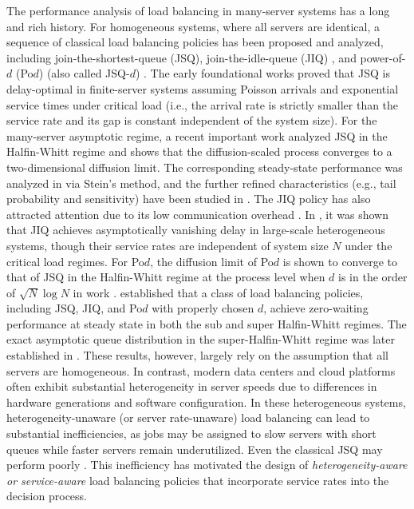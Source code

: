 \documentclass[11pt,oneside,letter]{article}
\begin{document}
The performance analysis of load balancing in many-server systems has a long and rich history. For homogeneous systems, where all servers are identical, a sequence of classical load balancing policies has been proposed and analyzed, including join-the-shortest-queue (JSQ), join-the-idle-queue (JIQ) \cite{LuXieKli_11,Sto_15}, and power-of-$d$ (Po$d$) (also called JSQ-$d$) \cite{Mit_96,VveDobKar_96}.
The early foundational works \cite{Win_77,Web_78} proved that JSQ is delay-optimal in finite-server systems assuming Poisson arrivals and exponential service times under critical load (i.e., the arrival rate is strictly smaller than the service rate and its gap is constant independent of the system size). For the many-server asymptotic regime, a recent important work \cite{EscGam_18} analyzed JSQ in the Halfin-Whitt regime and shows that the diffusion-scaled process converges to a two-dimensional diffusion limit. The corresponding steady-state performance was analyzed in \cite{Bra_20} via Stein's method, and the further refined characteristics (e.g., tail probability and sensitivity) have been studied in \cite{BanMuk_19,BanMuk_20}. 
The JIQ policy has also attracted attention due to its low communication overhead \cite{LuXieKli_11, Sto_15}. In \cite{Sto_15}, it was shown that JIQ achieves asymptotically vanishing delay 
in large-scale heterogeneous systems, though their service rates are independent of system size $N$ under the critical load regimes.  
For Po$d$, the diffusion limit of Po$d$ is shown to converge to that of JSQ in the Halfin-Whitt regime at the process level when $d$ is in the order of $\sqrt{N}\log N$ in work \cite{MukBorvan_18}. \cite{LiuYin_20,LiuYin_21} established that a class of load balancing policies, including JSQ, JIQ, and Po$d$ with properly chosen $d$, achieve zero-waiting performance at steady state in both the sub and super Halfin-Whitt regimes. The exact asymptotic queue distribution in the super-Halfin-Whitt regime was later established in \cite{ZhaBanMuk_25}. These results, however, largely rely on the assumption that all servers are homogeneous. In contrast, modern data centers and cloud platforms often exhibit substantial heterogeneity in server speeds due to differences in hardware generations and software configuration. In these heterogeneous systems, heterogeneity-unaware (or server rate-unaware) load balancing can lead to substantial inefficiencies, as jobs may be assigned to slow servers with short queues while faster servers remain underutilized. 
Even the classical JSQ may perform poorly \cite{GarJalWic_21}. 
This inefficiency has motivated the design of \emph{heterogeneity-aware or service-aware} load balancing policies that incorporate service rates into the decision process.
\end{document}
